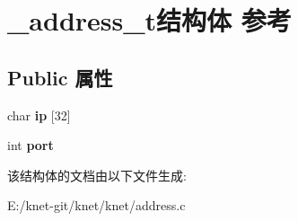 \hypertarget{struct__address__t}{}\section{\+\_\+address\+\_\+t结构体 参考}
\label{struct__address__t}
\subsection*{Public 属性}
\begin{DoxyCompactItemize}
\item 
\hypertarget{struct__address__t_ac3e75c7a8dd3efe8c59dc88b6063e079}{}char {\bfseries ip} \mbox{[}32\mbox{]}\label{struct__address__t_ac3e75c7a8dd3efe8c59dc88b6063e079}

\item 
\hypertarget{struct__address__t_aa9dafacc315dea6e76e247583b999577}{}int {\bfseries port}\label{struct__address__t_aa9dafacc315dea6e76e247583b999577}

\end{DoxyCompactItemize}


该结构体的文档由以下文件生成\+:\begin{DoxyCompactItemize}
\item 
E\+:/knet-\/git/knet/knet/address.\+c\end{DoxyCompactItemize}
